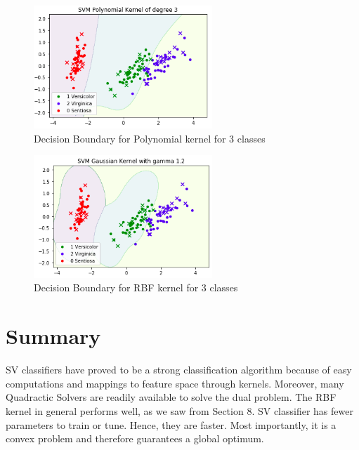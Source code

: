 \documentclass{article}
\begin{document}
\begin{figure}
  \centering
  \includegraphics[width=0.6\textwidth]{3class_poly.png}
  \caption{Decision Boundary for Polynomial kernel for 3 classes}
  \label{fig:fig9}
  \end{figure}
\begin{figure}
  \centering
  \includegraphics[width=0.6\textwidth]{3class_rbf.png}
  \caption{Decision Boundary for RBF kernel for 3 classes}
  \label{fig:fig9}
  \end{figure}

\section{Summary}
SV classifiers have proved to be a strong classification algorithm because of easy computations and mappings to feature space through kernels. Moreover, many Quadractic Solvers are readily available to solve the dual problem. The RBF kernel in general performs well, as we saw from Section 8. SV classifier has fewer parameters to train or tune. Hence, they are faster. Most importantly, it is a convex problem and therefore guarantees a global optimum.
  
\pagebreak
  
\end{document}
